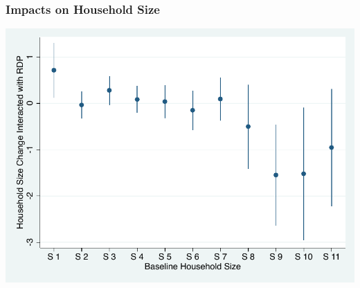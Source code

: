 \documentclass[aspectratio=149]{beamer}
\begin{document}
\begin{frame}
\frametitle{Impacts on Household Size}
\begin{center}  
  \includegraphics[scale=.75]{size_ch.pdf}
\end{center}
\end{frame}
\end{document}
